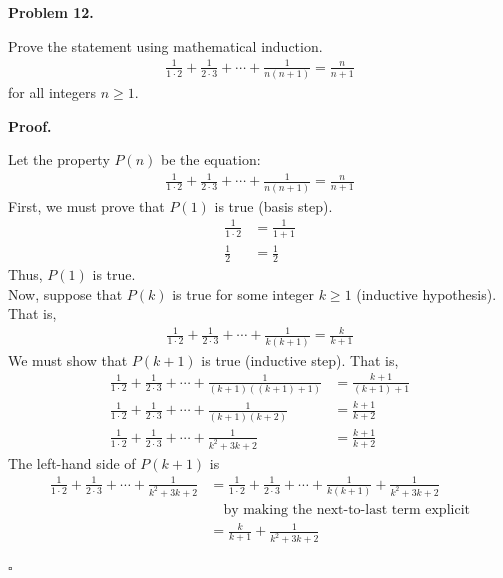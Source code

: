 \documentclass{article}
\newenvironment{problem}[1]{
    \begin{mdframed}[backgroundcolor=gray!20, skipabove=\baselineskip, skipbelow=\baselineskip, nobreak=true, innerleftmargin=10pt, innerrightmargin=10pt, innertopmargin=10pt, innerbottommargin=10pt]
    \textbf{Problem #1.}
}{
    \end{mdframed}
}
\newenvironment{proof}{
    \begin{mdframed}[nobreak=false, innerleftmargin=10pt, innerrightmargin=10pt, innertopmargin=10pt, innerbottommargin=10pt]
    \textbf{Proof.}
}{
    \hfill $\square$
    \end{mdframed}
}
\begin{document}
    \begin{problem}{12}
        Prove the statement using mathematical induction.
        \begin{align*}
            \frac{1}{1 \cdot 2} + \frac{1}{2 \cdot 3} + \cdots + \frac{1}{n(n+1)} = \frac{n}{n+1}
        \end{align*}
        for all integers $n \geq 1$.
    \end{problem}
    \begin{proof}
        Let the property $P(n)$ be the equation:
        \begin{align*}
            \frac{1}{1 \cdot 2} + \frac{1}{2 \cdot 3} + \cdots + \frac{1}{n(n+1)} = \frac{n}{n+1}
        \end{align*}
        First, we must prove that $P(1)$ is true (basis step). \\
        \begin{align*}
            \frac{1}{1 \cdot 2} &= \frac{1}{1+1} \\
            \frac{1}{2} &= \frac{1}{2}
        \end{align*}
        Thus, $P(1)$ is true. \\
        Now, suppose that $P(k)$ is true for some integer $k \geq 1$ (inductive hypothesis). That is,
        \begin{align*}
            \frac{1}{1 \cdot 2} + \frac{1}{2 \cdot 3} + \cdots + \frac{1}{k(k+1)} = \frac{k}{k+1}
        \end{align*}
        We must show that $P(k+1)$ is true (inductive step). That is,
        \begin{align*}
            \frac{1}{1 \cdot 2} + \frac{1}{2 \cdot 3} + \cdots + \frac{1}{(k+1)((k+1)+1)} &= \frac{k+1}{(k+1)+1} \\
            \frac{1}{1 \cdot 2} + \frac{1}{2 \cdot 3} + \cdots + \frac{1}{(k+1)(k+2)} &= \frac{k+1}{k+2} \\
            \frac{1}{1 \cdot 2} + \frac{1}{2 \cdot 3} + \cdots + \frac{1}{k^2 + 3k + 2} &= \frac{k+1}{k+2}
        \end{align*}
        The left-hand side of $P(k+1)$ is
        \begin{align*}
            \frac{1}{1 \cdot 2} + \frac{1}{2 \cdot 3} + \cdots + \frac{1}{k^2 + 3k + 2} &= \frac{1}{1 \cdot 2} + \frac{1}{2 \cdot 3} + \cdots + \frac{1}{k(k+1)} + \frac{1}{k^2 + 3k + 2} \\
            & \quad \text{by making the next-to-last term explicit} \\
            &= \frac{k}{k+1} + \frac{1}{k^2 + 3k + 2} \\

\end{align*}
\end{proof}
\end{document}
